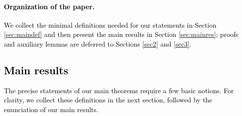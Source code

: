 \documentclass[preprint,hidelinks,authoryear]{elsarticle}
\theoremstyle{plain}
\theoremstyle{definition}
\theoremstyle{remark}
\begin{document}
\textcolor{black}{\paragraph*{Organization of the paper.}
We collect the minimal definitions needed for our statements in Section \ref{sec:maindef} and then present the main results in Section \ref{sec:mainres}; proofs and auxiliary lemmas are deferred to Sections \ref{sec2} and \ref{sec3}.}



\textcolor{black}{\section{Main results}\label{sec:main}
The precise statements of our main theorems require a few basic notions.
For clarity, we collect these definitions in the next section, followed by
the enunciation of our main results.
}
\end{document}
